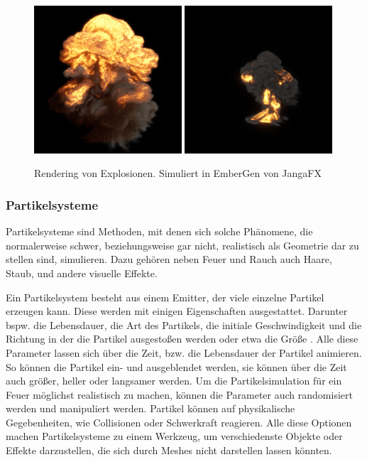 \begin{figure}[h!]
	\includegraphics[width=0.49\textwidth]{Grafiken/Basics/Fire/explosion_0000.png}
	\includegraphics[width=0.49\textwidth]{Grafiken/Basics/Fire/explosion2_0000_0000.png}
	\centering
	\begin{footnotesize}
		\caption{Rendering von Explosionen. Simuliert in EmberGen von JangaFX }
		
		\label{fig:explosion}
	\end{footnotesize}
\end{figure}


\subsubsection{Partikelsysteme}
Partikelsysteme sind Methoden, mit denen sich solche Phänomene, die normalerweise schwer, beziehungsweise gar nicht, realistisch 
als Geometrie dar zu stellen sind, simulieren. Dazu gehören neben Feuer und Rauch auch Haare, Staub, und andere visuelle Effekte.

Ein Partikelsystem besteht aus einem Emitter, der viele einzelne Partikel erzeugen kann. Diese werden mit einigen Eigenschaften ausgestattet. Darunter
bspw. die Lebensdauer, die Art des Partikels, die initiale Geschwindigkeit und die Richtung in der die Partikel ausgestoßen werden oder etwa die Größe \parencite{Reeves1983}.
Alle diese Parameter lassen sich über die Zeit, bzw. die Lebensdauer der Partikel animieren. 
So können die Partikel ein- und ausgeblendet werden, sie können über die Zeit auch größer, heller oder langsamer werden. 
Um die Partikelsimulation für ein Feuer möglichst realistisch zu machen, können die Parameter auch randomisiert werden und manipuliert werden.
Partikel können auf physikalische Gegebenheiten, wie Collisionen oder Schwerkraft reagieren. Alle diese Optionen machen Partikelsysteme zu einem 
Werkzeug, um verschiedenste Objekte oder Effekte darzustellen, die sich durch Meshes nicht darstellen lassen könnten. 

